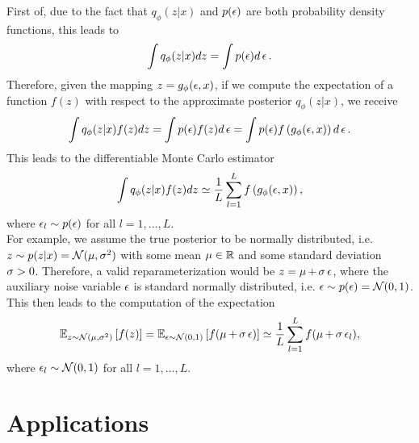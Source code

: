 First of, due to the fact that $q_{\phi} (z|x)$ and $p(\operatorname{\epsilon})$ are both probability density functions, this leads to
\begin{align*}
\int q_{\phi} (z|x) dz = \int p(\operatorname{\epsilon}) d\operatorname{\epsilon}.
\end{align*}
Therefore, given the mapping $z = g_{\phi}(\operatorname{\epsilon}, x)$, if we compute the expectation of a function $f(z)$ with respect to the approximate posterior $q_{\phi}(z|x)$, we receive
\begin{align*}
\int q_{\phi}(z|x) f(z) dz = \int p(\operatorname{\epsilon}) f(z) d\operatorname{\epsilon} = \int p(\operatorname{\epsilon}) f\left(g_{\phi}(\operatorname{\epsilon}, x) \right)d\operatorname{\epsilon}.
\end{align*}
This leads to the differentiable Monte Carlo estimator
\begin{align*}
\int q_{\phi}(z|x) f(z) dz \simeq \frac{1}{L} \sum_{l=1}^L f\left(g_{\phi} (\operatorname{\epsilon}, x)\right),
\end{align*}
where $\operatorname{\epsilon}_l\sim p(\operatorname{\epsilon})$ for all $l=1,\ldots, L$.\\
For example, we assume the true posterior to be normally distributed, i.e. $z\sim p(z|x)=\mathcal{N}(\operatorname{\mu}, \operatorname{\sigma}^2)$ with some mean $\operatorname{\mu}\in\operatorname{\mathbb{R}}$ and some standard deviation $\operatorname{\sigma}>0$. Therefore, a valid reparameterization would be $z = \operatorname{\mu} +\operatorname{\sigma}\operatorname{\epsilon}$, where the auxiliary noise variable $\operatorname{\epsilon}$ is standard normally distributed, i.e. $\operatorname{\epsilon}\sim p(\operatorname{\epsilon}) = \mathcal{N}(0,1)$. This then leads to the computation of the expectation
\begin{align*}
\operatorname{\mathbb{E}}_{z\sim \mathcal{N}(\operatorname{\mu}, \operatorname{\sigma}^2)} \left[ f(z) \right] = \operatorname{\mathbb{E}}_{\operatorname{\epsilon} \sim \mathcal{N}(0, 1)} \left[ f(\operatorname{\mu} + \operatorname{\sigma}\operatorname{\epsilon}) \right] \simeq \frac{1}{L} \sum_{l=1}^L f(\operatorname{\mu} + \operatorname{\sigma}\operatorname{\epsilon}_l),
\end{align*}
where $\operatorname{\epsilon}_l\sim \mathcal{N}(0, 1)$ for all $l=1,\ldots, L$.

\section{Applications}\label{sec:vae_applications}

